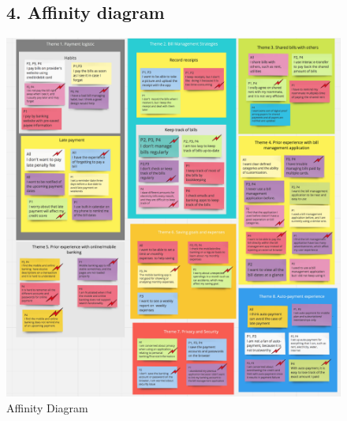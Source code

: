 \documentclass{sigchi}
\begin{document}
\clearpage


\begin{figure}[h!]
  \subsection{4. Affinity diagram}
  \centering
  \includegraphics[width=\textwidth]{Affinity_Diagram.png}
  \caption{Affinity Diagram}
  \label{fig:figure7}
\end{figure}



\clearpage
\newpage
\end{document}
